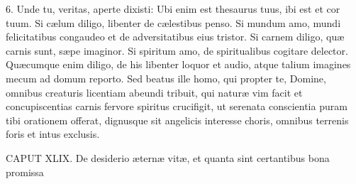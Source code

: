 \documentclass[twoside]{article}
\begin{document}
6. Unde tu, veritas, aperte dixisti: Ubi enim est thesaurus tuus, ibi est et cor tuum. Si cælum diligo, libenter de cælestibus penso. Si mundum amo, mundi felicitatibus congaudeo et de adversitatibus eius tristor. Si carnem diligo, quæ carnis sunt, sæpe imaginor. Si spiritum amo, de spiritualibus cogitare delector. Quæcumque enim diligo, de his libenter loquor et audio, atque talium imagines mecum ad domum reporto. Sed beatus ille homo, qui propter te, Domine, omnibus creaturis licentiam abeundi tribuit, qui naturæ vim facit et concupiscentias carnis fervore spiritus crucifigit, ut serenata conscientia puram tibi orationem offerat, dignusque sit angelicis interesse choris, omnibus terrenis foris et intus exclusis.


CAPUT XLIX.
De desiderio æternæ vitæ, et quanta sint certantibus bona promissa
\end{document}
